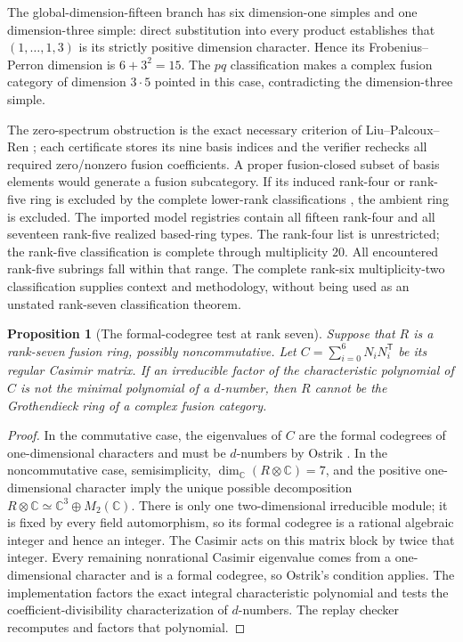 \documentclass[11pt]{article}
\newtheorem{proposition}[theorem]{Proposition}
\newcommand{\C}{\mathbb C}
\begin{document}
The global-dimension-fifteen branch has six dimension-one simples and
one dimension-three simple: direct substitution into every product
establishes that $(1,\ldots,1,3)$ is its strictly positive dimension
character. Hence its Frobenius--Perron dimension is $6+3^2=15$.
The $pq$ classification \cite[Theorems~3.1 and~5.1]{EGO} makes a
complex fusion category of dimension $3\cdot5$ pointed in this case,
contradicting the dimension-three simple.

The zero-spectrum obstruction is the exact necessary criterion of
Liu--Palcoux--Ren \cite{LPR}; each certificate stores its nine basis
indices and the verifier rechecks all required zero/nonzero fusion
coefficients. A proper fusion-closed subset of basis elements would
generate a fusion subcategory. If its induced rank-four or rank-five
ring is excluded by the complete lower-rank classifications
\cite{Rank4,Rank5}, the ambient ring is excluded. The imported
model registries contain all fifteen rank-four and all seventeen
rank-five realized based-ring types. The rank-four list is unrestricted;
the rank-five classification is complete through multiplicity $20$.
All encountered rank-five subrings fall within that range. The complete rank-six multiplicity-two classification
\cite{Rank6} supplies context and methodology, without being used as
an unstated rank-seven classification theorem.

\begin{proposition}[The formal-codegree test at rank seven]
\label{prop:dnumber}
Suppose that $R$ is a rank-seven fusion ring, possibly noncommutative.
Let $C=\sum_{i=0}^6 N_iN_i^{\mathsf T}$ be its regular Casimir matrix.
If an irreducible factor of the characteristic polynomial of $C$ is
not the minimal polynomial of a $d$-number, then $R$ cannot be the
Grothendieck ring of a complex fusion category.
\end{proposition}
\begin{proof}
In the commutative case, the eigenvalues of $C$ are the formal
codegrees of one-dimensional characters and must be $d$-numbers by
Ostrik \cite{OstrikCodegrees}. In the noncommutative case,
semisimplicity, $\dim_\C(R\otimes\C)=7$, and the positive
one-dimensional character imply the unique possible decomposition
$R\otimes\C\simeq\C^3\oplus M_2(\C)$.
There is only one two-dimensional irreducible module; it is fixed by
every field automorphism, so its formal codegree is a rational
algebraic integer and hence an integer. The Casimir acts on this
matrix block by twice that integer. Every remaining nonrational
Casimir eigenvalue comes from a one-dimensional character and is a
formal codegree, so Ostrik's condition applies. The implementation
factors the exact integral characteristic polynomial and tests the
coefficient-divisibility characterization of $d$-numbers. The replay
checker recomputes and factors that polynomial.
\end{proof}
\end{document}
